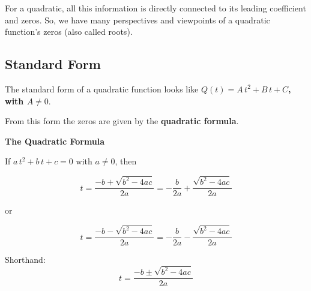 \documentclass{ximera}
\begin{document}
For a quadratic, all this information is directly connected to its leading coefficient and zeros.  So, we have many perspectives and viewpoints of a quadratic function's zeros (also called roots).


















\subsection*{Standard Form}






The standard form of a quadratic function looks like \textbf{$Q(t) = A \, t^2 + B \, t + C$, with $A \ne 0$}.  

From this form the zeros are given by the \textbf{quadratic formula}.





\begin{definition} \textbf{\textcolor{green!50!black}{The Quadratic Formula}} 



If $a \, t^2 + b \, t + c = 0$ with $a \ne 0$, then


\[ t    = \frac{-b + \sqrt{b^2 - 4 a c}}{2a}  = - \frac{b}{2 a} + \frac{\sqrt{b^2 - 4 a c}}{2a}     \]

or

\[ t   =    \frac{-b - \sqrt{b^2 - 4 a c}}{2a}   = - \frac{b}{2 a}  -\frac{\sqrt{b^2 - 4 a c}}{2a}   \]



Shorthand: 
\[ t  =   \frac{-b \pm \sqrt{b^2 - 4 a c}}{2a}      \]


\end{definition}
\end{document}
